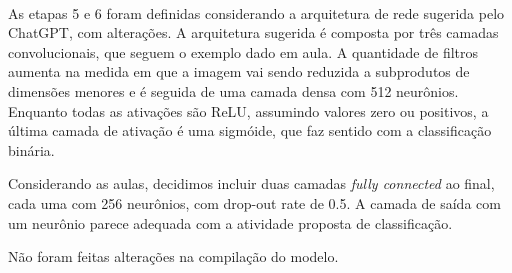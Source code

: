 \documentclass[
  a4paperpaper,
]{article}
\begin{document}
~

As etapas 5 e 6 foram definidas considerando a arquitetura de rede
sugerida pelo ChatGPT, com alterações. A arquitetura sugerida é composta
por três camadas convolucionais, que seguem o exemplo dado em aula. A
quantidade de filtros aumenta na medida em que a imagem vai sendo
reduzida a subprodutos de dimensões menores e é seguida de uma camada
densa com 512 neurônios. Enquanto todas as ativações são ReLU, assumindo
valores zero ou positivos, a última camada de ativação é uma sigmóide,
que faz sentido com a classificação binária.

Considerando as aulas, decidimos incluir duas camadas \emph{fully
connected} ao final, cada uma com 256 neurônios, com drop-out rate de
0.5. A camada de saída com um neurônio parece adequada com a atividade
proposta de classificação.

Não foram feitas alterações na compilação do modelo.

~
\end{document}
